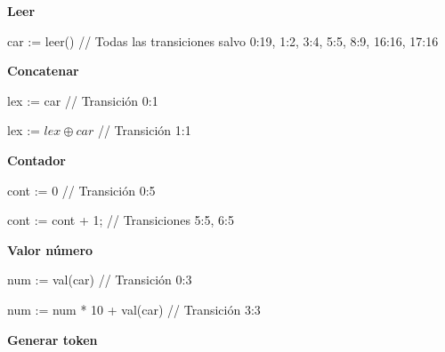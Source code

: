 \documentclass{article}
\begin{document}
\vspace{0.3cm}

\textbf{Leer}

    car := leer() \hspace{3.5cm}	// Todas las transiciones salvo 0:19, 1:2, 3:4, 5:5, 8:9, 16:16, 17:16

\vspace{0.3cm}

\textbf{Concatenar}

    lex := car  \hspace{4cm}	// Transición 0:1
    
    lex := $ lex \oplus  car $ \hspace{3cm}	// Transición 1:1


\vspace{0.3cm}

\textbf{Contador }

    cont := 0 \hspace{4cm} // Transición 0:5 
    
    cont := cont + 1; \hspace{2.7cm}	// Transiciones 5:5, 6:5 


\vspace{0.3cm}

\textbf{Valor número}
 
    num := val(car) \hspace{2.9cm} 	// Transición 0:3
    
    num := num * 10 + val(car) \hspace{0.9cm} 	// Transición 3:3


\vspace{0.3cm}

\textbf{Generar token}
\end{document}
